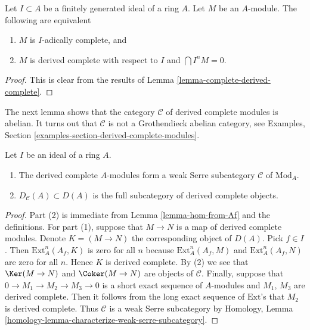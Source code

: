 \begin{proposition}
\label{proposition-derived-complete-modules}
Let $I \subset A$ be a finitely generated ideal of a ring $A$.
Let $M$ be an $A$-module. The following are equivalent
\begin{enumerate}
\item $M$ is $I$-adically complete, and
\item $M$ is derived complete with respect to $I$ and $\bigcap I^nM = 0$.
\end{enumerate}
\end{proposition}

\begin{proof}
This is clear from the results of
Lemma \ref{lemma-complete-derived-complete}.
\end{proof}

\noindent
The next lemma shows that the category $\mathcal{C}$
of derived complete modules is abelian. It turns out that $\mathcal{C}$
is not a Grothendieck abelian category, see
Examples, Section \ref{examples-section-derived-complete-modules}.

\begin{lemma}
\label{lemma-serre-subcategory}
Let $I$ be an ideal of a ring $A$.
\begin{enumerate}
\item The derived complete $A$-modules form a weak Serre
subcategory $\mathcal{C}$ of $\text{Mod}_A$.
\item $D_\mathcal{C}(A) \subset D(A)$ is the full subcategory
of derived complete objects.
\end{enumerate}
\end{lemma}

\begin{proof}
Part (2) is immediate from Lemma \ref{lemma-hom-from-Af}
and the definitions. For part (1), suppose that $M \to N$ is
a map of derived complete modules. Denote $K = (M \to N)$
the corresponding object of $D(A)$. Pick $f \in I$. Then
$\text{Ext}_A^n(A_f, K)$ is zero for all $n$ because
$\text{Ext}_A^n(A_f, M)$ and $\text{Ext}_A^n(A_f, N)$ are zero for all $n$.
Hence $K$ is derived complete. By (2) we see that $\Ker(M \to N)$ and
$\Coker(M \to N)$ are objects of $\mathcal{C}$.
Finally, suppose that $0 \to M_1 \to M_2 \to M_3 \to 0$
is a short exact sequence of $A$-modules and
$M_1$, $M_3$ are derived complete. Then it follows from
the long exact sequence of $\text{Ext}$'s that $M_2$
is derived complete. Thus $\mathcal{C}$ is a weak Serre subcategory by
Homology, Lemma \ref{homology-lemma-characterize-weak-serre-subcategory}.
\end{proof}

